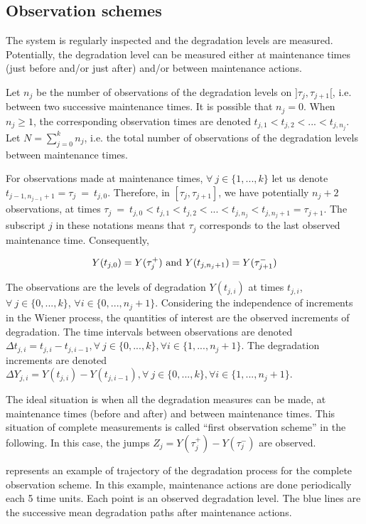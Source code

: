 \subsection{Observation schemes} 
\label{section:scheme}

The system is regularly inspected and the degradation levels are measured. Potentially, the degradation level can be measured either at maintenance times (just before and/or just after) and/or between maintenance actions.

Let $n_j$ be the number of observations of the degradation levels on $]\tau_j, \tau_{j+1}[$, i.e. between two successive maintenance times. It is possible that $n_j=0$. When $n_j \geq 1$, the corresponding observation times are denoted $t_{j,1} < t_{j,2} <...<t_{j,n_j}$. Let $N=\sum\limits_{j=0}^{k} n_j$, i.e. the total number of observations of the degradation levels between maintenance times.

For observations made at maintenance times, $\forall\ j \in \{1,...,k\}$ let us denote $t_{j-1,n_{j-1}+1}=\tau_j\ =\ t_{j,0}$. Therefore, in $[\tau_j, \tau_{j+1}]$, we have potentially $n_j+2$ observations, at times $\tau_j\ =\ t_{j,0} < t_{j,1} < t_{j,2} <...< t_{j,n_j} < t_{j,n_j+1} = \tau_{j+1}$. The subscript $j$ in these notations means that $\tau_j$ corresponds to the last observed maintenance time. Consequently,

$$Y(t_{j,0})=Y(\tau_j^+) \hbox{ and } Y(t_{j,n_j+1})=Y(\tau_{j+1}^-)$$

The observations are the levels of degradation $Y(t_{j,i})$ at times $t_{j,i}$, $\forall\ j \in \{0,...,k\}$, $\forall i \in\{0,...,n_j+1\}$. 
Considering the independence of increments in the Wiener process, the quantities of interest are the observed increments of degradation. 
The time intervals between observations are denoted $\Delta t_{j,i}=t_{j,i}-t_{j,i-1}, \forall\ j \in \{0,...,k\}, \forall i \in\{1,...,n_j+1\}$.
The degradation increments are denoted
$\Delta Y_{j,i}=Y(t_{j,i})-Y(t_{j,i-1}), \forall\ j \in \{0,...,k\}, \forall i \in \{1,...,n_j+1\}$.

The ideal situation is when all the degradation measures can be made, at maintenance times (before and after) and between maintenance times. This situation of complete measurements is called ``first observation scheme'' in the following. In this case, the jumps $Z_j = Y(\tau_{j}^+) - Y(\tau_{j}^-)$ are observed.

 represents an example of trajectory of the degradation process for the complete observation scheme. In this example, maintenance actions are done periodically each 5 time units. Each point is an observed degradation level. The blue lines are the successive mean degradation paths after maintenance actions.

